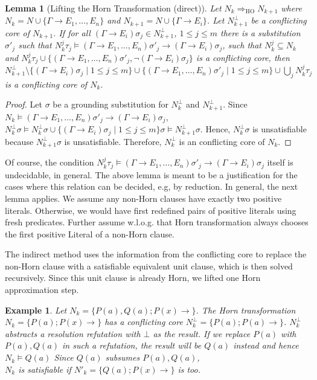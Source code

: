 \documentclass{llncs}
\newcommand{\sat}{\vDash}
\newcommand{\imp}{\rightarrow}
\newtheorem{lem}[theorem]{Lemma}
\newtheorem{exmp}{Example}
\begin{document}
\begin{lem}[Lifting the Horn Transformation (direct)]\label{lifthorn1}
Let $N_k\Rightarrow_{\text{HO}} N_{k+1}$ where 
$N_k = N\cup\{\Gamma \imp E_1, \dots,E_n\}$ and $N_{k+1} = N\cup\{\Gamma \imp E_i\}$.
Let $N^\bot_{k+1}$ be a conflicting core of $N_{k+1}$.
If for all $(\Gamma \imp E_i)\sigma_j\in N^\bot_{k+1}$, $1\leq j\leq m$ there is a 
substitution $\sigma'_j$ such that
$N_k^j\tau_j\models  (\Gamma \imp E_1, \dots,E_n)\sigma'_j\rightarrow (\Gamma \imp E_i)\sigma_j$,
such that $N_k^j\subseteq N_k$ and 
$N_k^j\tau_j \cup \{(\Gamma \imp E_1, \dots,E_n)\sigma'_j, \neg(\Gamma \imp E_i)\sigma_j\}$
is a conflicting core, then
$N^\bot_{k+1}\setminus \{(\Gamma \imp E_i)\sigma_j \mid 1\leq j\leq m\} \cup \{(\Gamma \imp E_1, \dots,E_n)\sigma'_j\mid 1\leq j\leq m\}\cup \bigcup\limits_j N_k^j\tau_j$ is
a conflicting core of $N_k$.
\end{lem}

\begin{proof}
Let  $\sigma$ be a grounding substitution for $N^\bot_{k}$ and $N^\bot_{k+1}$. 
Since $N_k\models  (\Gamma \imp E_1, \dots,E_n)\sigma'_j\rightarrow (\Gamma \imp E_i)\sigma_j$,
$N^\bot_{k}\sigma \models N^\bot_{k}\sigma \cup \{(\Gamma \imp E_i)\sigma_j \mid 1\leq j\leq m\}\sigma \models N^\bot_{k+1}\sigma$.
Hence, $N^\bot_{k}\sigma$ is unsatisfiable because $N^\bot_{k+1}\sigma$ is unsatisfiable.
Therefore, $N^\bot_{k}$ is an conflicting core of $N_k$.
\end{proof}


Of course, the condition $N_k^j\tau_j\models  (\Gamma \imp E_1, \dots,E_n)\sigma'_j\rightarrow (\Gamma \imp E_i)\sigma_j$ itself is undecidable, in general. The above lemma is meant to be a justification for
the cases where this relation can be decided, e.g, by reduction. In general, the next lemma applies.
We assume any non-Horn clauses have exactly two positive literals. 
Otherwise, we would have first redefined pairs of positive literals using fresh predicates. 
Further assume w.l.o.g. that Horn transformation always chooses the first positive Literal of a non-Horn clause.

The indirect method uses the information from the conflicting core to replace the non-Horn clause with a satisfiable equivalent unit clause,
which is then  solved recursively. Since this unit clause is already Horn, we lifted
one Horn approximation step.

\begin{exmp}
Let $N_k = \{ P(a),Q(a);  P(x)\imp\}$. 
The Horn transformation $N_k=\{  P(a); P(x) \imp\}$ has a conflicting core 
$N^\bot_k= \{  P(a); P(a) \imp\}$.
$N^\bot_k$ abstracts a resolution refutation with $\bot$ as the result.
If we replace  $ P(a)$ with $P(a),Q(a)$ in such a refutation,  the result will be $Q(a)$ instead and hence $N_k \sat Q(a)$ 
Since $Q(a)$ subsumes $P(a),Q(a)$, \\ $N_k$ is satisfiable if $N'_k=\{ Q(a);  P(x)\imp\}$ is too.
\end{exmp} 
\end{document}
